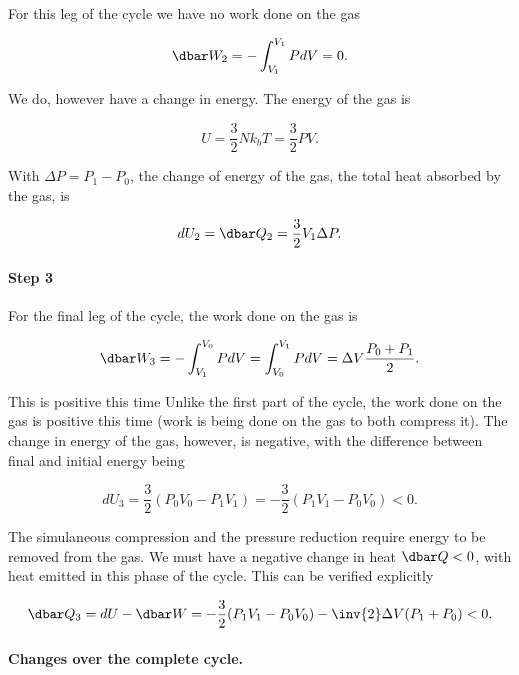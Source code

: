 {For this leg of the cycle we have no work done on the gas

\begin{equation}\label{eqn:basicStatMechProblemSet4Problem2:140}
\dbar W_2 = -\int_{V_1}^{V_1} P dV = 0.
\end{equation}

We do, however have a change in energy.  The energy of the gas is

\begin{equation}\label{eqn:basicStatMechProblemSet4Problem2:160}
U = \frac{3}{2} N k_b T = \frac{3}{2} P V.
\end{equation}

With $\Delta P = P_1 - P_0$, the change of energy of the gas, the total heat absorbed by the gas, is

\begin{equation}\label{eqn:basicStatMechProblemSet4Problem2:180}
dU_2 = \dbar Q_2 = \frac{3}{2} V_1 \Delta P.
\end{equation}

\paragraph{Step 3}

For the final leg of the cycle, the work done on the gas is 

\begin{dmath}\label{eqn:basicStatMechProblemSet4Problem2:200}
\dbar W_3
= 
-\int_{V_1}^{V_0} P dV
= 
\int_{V_0}^{V_1} P dV
=
\Delta V \frac{P_0 + P_1}{2}.
\end{dmath}

This is positive this time 
Unlike the first part of the cycle, the work done on the gas is positive this time (work is being done on the gas to both compress it).  The change in energy of the gas, however, is negative, with the difference between final and initial energy being

\begin{dmath}\label{eqn:basicStatMechProblemSet4Problem2:220}
dU_3
= \frac{3}{2} (P_0 V_0 - P_1 V_1) 
= -\frac{3}{2} (P_1 V_1 - P_0 V_0) 
<0.
\end{dmath}

The simulaneous compression and the pressure reduction require energy to be removed from the gas.  We must have a negative change in heat $\dbar Q < 0$, with heat emitted in this phase of the cycle.  This can be verified explicitly

\begin{dmath}\label{eqn:basicStatMechProblemSet4Problem2:240}
\dbar Q_3
= dU - \dbar W 
= -\frac{3}{2} (P_1 V_1 - P_0 V_0) 
- \inv{2} \Delta V (P_1 + P_0)
< 0.
\end{dmath}

\paragraph{Changes over the complete cycle.}

}
